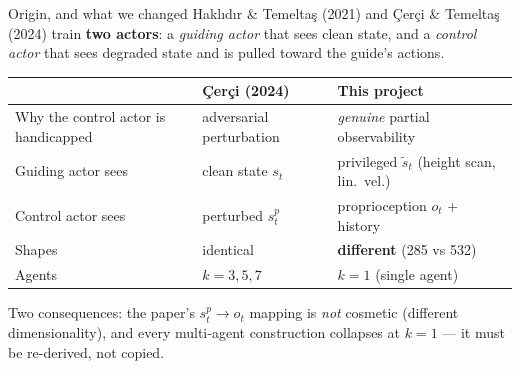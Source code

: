 \documentclass[aspectratio=169]{beamer}
\newcommand{\ot}{o_t}
\newcommand{\st}{\tilde{s}_t}
\begin{document}
\begin{frame}{Origin, and what we changed}
  Haklıdır \& Temeltaş (2021) and Çerçi \& Temeltaş (2024) train \textbf{two actors}:
  a \emph{guiding actor} that sees clean state, and a \emph{control actor} that sees
  degraded state and is pulled toward the guide's actions.

  \vspace{0.5em}
  \begin{center}
  \scriptsize
  \begin{tabular}{lll}
    \toprule
     & \textbf{Çerçi (2024)} & \textbf{This project} \\
    \midrule
    Why the control actor is handicapped & adversarial perturbation & \emph{genuine} partial observability \\
    Guiding actor sees & clean state $s_t$ & privileged $\st$ (height scan, lin.\ vel.) \\
    Control actor sees & perturbed $s^p_t$ & proprioception $\ot$ + history \\
    Shapes & identical & \textbf{different} (285 vs 532) \\
    Agents & $k = 3,5,7$ & $k = 1$ (single agent) \\
    \bottomrule
  \end{tabular}
  \end{center}

  \vspace{0.4em}
  {\footnotesize Two consequences: the paper's $s^p_t \!\to\! \ot$ mapping is \emph{not}
  cosmetic (different dimensionality), and every multi-agent construction collapses at
  $k=1$ --- it must be re-derived, not copied.}
\end{frame}
\end{document}
